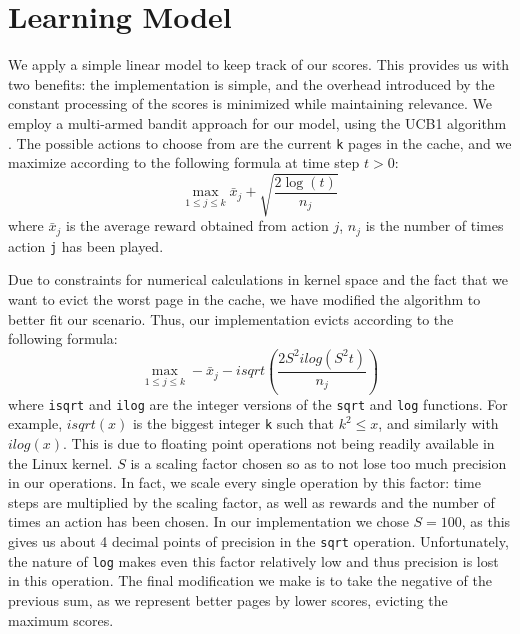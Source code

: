 \section{Learning Model} \label{section:learning}

We apply a simple linear model to keep track of our scores. This provides us with two benefits: the implementation is simple, and the overhead introduced by the constant processing of the scores is minimized while maintaining relevance. We employ a multi-armed bandit approach for our model, using the UCB1 algorithm \cite{Auer:2002}. The possible actions to choose from are the current \texttt{k} pages in the cache, and we maximize according to the following formula at time step $t>0$: $$\max_{1 \leq j \leq k} \bar{x}_{j} + \sqrt{\frac{2\log(t)}{n_{j}}}$$  where $\bar{x}_{j}$ is the average reward obtained from action $j$, $n_{j}$ is the number of times action \texttt{j} has been played.

Due to constraints for numerical calculations in kernel space and the fact that we want to evict the worst page in the cache, we have modified the algorithm to better fit our scenario. Thus, our implementation evicts according to the following formula:  $$\max_{1 \leq j \leq k} -\bar{x}_{j} - isqrt(\frac{2S^{2}ilog(S^{2}t)}{n_{j}})$$ where \texttt{isqrt} and \texttt{ilog} are the integer versions of the \texttt{sqrt} and \texttt{log} functions. For example, $isqrt(x)$ is the biggest integer \texttt{k} such that $k^{2}\leq x$, and similarly with $ilog(x)$. This is due to floating point operations not being readily available in the Linux kernel. $S$ is a scaling factor chosen so as to not lose too much precision in our operations. In fact, we scale every single operation by this factor: time steps are multiplied by the scaling factor, as well as rewards and the number of times an action has been chosen. In our implementation we chose $S=100$, as this gives us about 4 decimal points of precision in the \texttt{sqrt} operation. Unfortunately, the nature of \texttt{log} makes even this factor relatively low and thus precision is lost in this operation. The final modification we make is to take the negative of the previous sum, as we represent better pages by lower scores, evicting the maximum scores.
